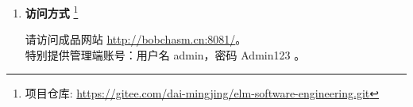 \begin{enumerate}
    \item \textbf{访问方式} \footnote{项目仓库: \href{https://gitee.com/dai-mingjing/elm-software-engineering.git}{https://gitee.com/dai-mingjing/elm-software-engineering.git}} \par
    请访问成品网站 \href{http://bobchasm.cn:8081/}{http://bobchasm.cn:8081/}。\\
    特别提供管理端账号：用户名 admin，密码 Admin123 。

\end{enumerate}